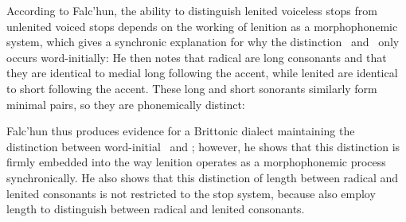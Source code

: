According to Falc'hun, the ability to distinguish lenited voiceless stops from unlenited voiced stops depends on the working of lenition as a morphophonemic system, which gives a synchronic explanation for why the distinction \lT\ and \xD\ only occurs word-initially:
He then notes that radical  are long consonants and that they are identical to medial long  following the accent, while lenited  are identical to short  following the accent. These long and short sonorants similarly form minimal pairs, so they are phonemically distinct:
\begin{mwl}
\end{mwl}
Falc'hun thus produces evidence for a Brittonic dialect maintaining the distinction between word-initial \lT\ and \xD; however, he shows that this distinction is firmly embedded into the way lenition operates as a morphophonemic process synchronically. He also shows that this distinction of length between radical and lenited consonants is not restricted to the stop system, because  also employ length to distinguish between radical and lenited consonants.


